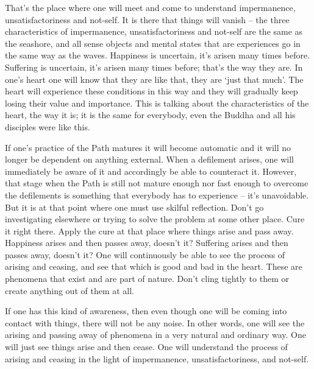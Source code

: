 That's the place where one will meet and come to understand impermanence, unsatisfactoriness and not-self. It is there that things will vanish -- the three characteristics of impermanence, unsatisfactoriness and not-self are the same as the seashore, and all sense objects and mental states that are experiences go in the same way as the waves. Happiness is uncertain, it's arisen many times before. Suffering is uncertain, it's arisen many times before; that's the way they are. In one's heart one will know that they are like that, they are `just that much'. The heart will experience these conditions in this way and they will gradually keep losing their value and importance. This is talking about the characteristics of the heart, the way it is; it is the same for everybody, even the Buddha and all his disciples were like this.

If one's practice of the Path matures it will become automatic and it will no longer be dependent on anything external. When a defilement arises, one will immediately be aware of it and accordingly be able to counteract it. However, that stage when the Path is still not mature enough nor fast enough to overcome the defilements is something that everybody has to experience -- it's unavoidable. But it is at that point where one must use skilful reflection. Don't go investigating elsewhere or trying to solve the problem at some other place. Cure it right there. Apply the cure at that place where things arise and pass away.  Happiness arises and then passes away, doesn't it? Suffering arises and then passes away, doesn't it? One will continuously be able to see the process of arising and ceasing, and see that which is good and bad in the heart. These are phenomena that exist and are part of nature. Don't cling tightly to them or create anything out of them at all.

If one has this kind of awareness, then even though one will be coming into contact with things, there will not be any noise. In other words, one will see the arising and passing away of phenomena in a very natural and ordinary way. One will just see things arise and then cease. One will understand the process of arising and ceasing in the light of impermanence, unsatisfactoriness, and not-self.

